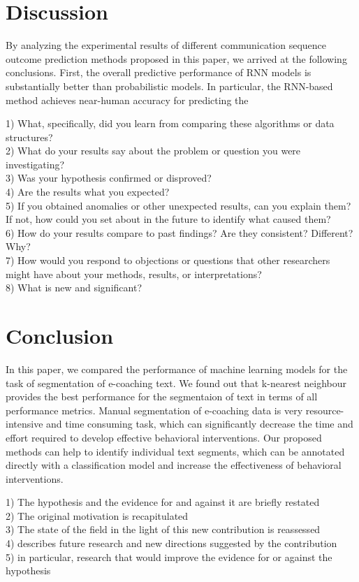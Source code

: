\documentclass{amia}
\begin{document}
\section*{Discussion}
By analyzing the experimental results of different communication sequence outcome prediction methods proposed in this paper, we arrived at the following conclusions. First, the overall predictive
performance of RNN models is substantially better than probabilistic models. In particular, the RNN-based method achieves near-human accuracy for predicting the 


1) What, specifically, did you learn from comparing these algorithms or data structures? \\
2) What do your results say about the problem or question you were investigating?\\
3) Was your hypothesis confirmed or disproved?\\
4) Are the results what you expected?\\
5) If you obtained anomalies or other unexpected results, can you explain them? If not, how could you set about in the future to identify what caused them? \\
6) How do your results compare to past findings? Are they consistent? Different?Why? \\
7) How would you respond to objections or questions that other researchers might have about your methods, results, or interpretations? \\
8) What is new and significant?\\
 
\section*{Conclusion}
In this paper, we compared the performance of machine learning models for the task of segmentation of e-coaching text. We found out that k-nearest neighbour provides the best performance for the segmentaion of text in terms of all performance metrics. Manual segmentation of e-coaching data is very resource-intensive and time consuming task, which can significantly decrease the time and effort required to develop effective behavioral interventions. Our
proposed methods can help to identify individual text segments, which can be annotated directly with a classification model and increase
the effectiveness of behavioral interventions. 

1) The hypothesis and the evidence for and against it are briefly restated \\
2) The original motivation is recapitulated \\
3) The state of the field in the light of this new contribution is reassessed \\
4) describes future research and new directions suggested by the contribution\\
5) in particular, research that would improve the evidence for or against the hypothesis
\end{document}
